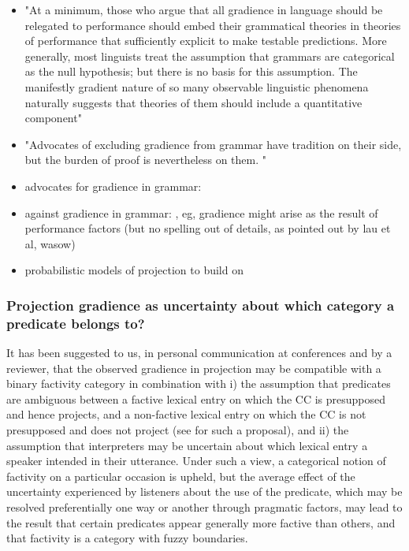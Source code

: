 \documentclass[11pt,fleqn]{article}
\newcommand{\6}{\mbox{$[\hspace*{-.6mm}[$}}
\newcommand{\9}{\mbox{$]\hspace*{-.6mm}]$}}
\begin{document}
\begin{itemize}
	\item "At a minimum, those
who argue that all gradience in language should be relegated to performance
should embed their grammatical theories in theories of performance that
sufficiently explicit to make testable predictions.
More generally, most linguists treat the assumption that grammars are
categorical as the null hypothesis; but there is no basis for this assumption. The
manifestly gradient nature of so many observable linguistic phenomena naturally
suggests that theories of them should include a quantitative component" \cite{wasow2007}
\item "Advocates of excluding gradience from grammar
have tradition on their side, but the burden of proof is nevertheless on them. " \cite{wasow2007}
	\item advocates for gradience in grammar: \cite{keller2000,sorace2005,lau2014,lau2017,wasow2007}
	\item against gradience in grammar: \cite{sprouse2007,sprouse2013, hofmeister2010}, eg, gradience might arise as the result of performance factors (but no spelling out of details, as pointed out by lau et al, wasow)
	\item probabilistic models of projection to build on \cite{qing2016, stevens-etal2017}
\end{itemize}

\subsubsection{Projection gradience as uncertainty about which category a predicate belongs to?}\label{s412}

It has been suggested to us, in personal communication at conferences and by a reviewer, that the observed gradience in projection may be compatible with a binary factivity category in combination with i) the assumption that predicates are ambiguous between a factive lexical entry on which the CC is presupposed and hence projects, and a non-factive lexical entry on which the CC is not presupposed and does not project (see \citealt[1736]{spector-egre2015} for such a proposal), and ii) the assumption that interpreters may be uncertain about which lexical entry a speaker intended in their utterance. Under such a view, a categorical notion of factivity on a particular occasion is upheld, but the average effect of the uncertainty experienced by listeners about the use of the predicate, which may be resolved preferentially one way or another through pragmatic factors, may lead to the result that certain predicates appear generally more factive than others, and that factivity is a category with fuzzy boundaries.
\end{document}

